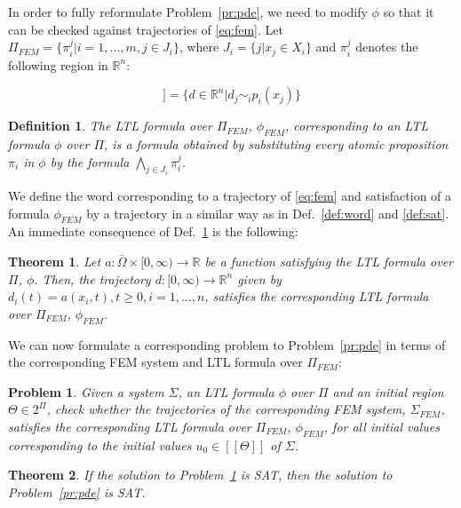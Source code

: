 \documentclass{article}
\newtheorem{theorem}{Theorem}
\newtheorem{definition}{Definition}
\newtheorem{problem}{Problem}
\newcommand*{\R}{\mathbb{R}}
\newcommand*{\psat}[1]{[[#1]]}
\begin{document}
\iffalse

In order to fully reformulate Problem~\ref{pr:pde}, we need to modify $\phi$ so
that it can be checked against trajectories of \eqref{eq:fem}. Let $\Pi_{FEM} =
\{\pi_i^j | i =1,...,m, j \in J_i\}$, where $J_i = \{j | x_j \in X_i\}$ and
$\pi_i^j$ denotes the following region in $\R^n$:

\begin{equation}
    \psat{\pi_i^j} = \{d \in \R^n | d_j \sim_i p_i(x_j)\}
\end{equation}

\begin{definition}\label{def:femformula}
    The LTL formula over $\Pi_{FEM}$, $\phi_{FEM}$, corresponding to an LTL formula
    $\phi$ over $\Pi$, is a formula obtained by substituting every atomic
    proposition $\pi_i$ in $\phi$ by the formula $\bigwedge_{j \in J_i}
    \pi_i^j$.
\end{definition}

We define the word corresponding to a trajectory of \eqref{eq:fem} and
satisfaction of a formula $\phi_{FEM}$ by a trajectory in a similar way as in
Def.~\ref{def:word} and \ref{def:sat}. An immediate consequence of
Def.~\ref{def:femformula} is the following:

\begin{theorem}\label{th:equiv}
    Let $a : \bar\Omega \times [0, \infty) \rightarrow \R$ be a function
    satisfying the LTL formula over $\Pi$, $\phi$. Then, the trajectory $d : [0,
    \infty) \rightarrow \R^n$ given by $d_i(t) = a(x_i, t), t \geq 0, i =
    1,...,n$, satisfies the corresponding LTL formula over $\Pi_{FEM}$, $\phi_{FEM}$.
\end{theorem}

We can now formulate a corresponding problem to Problem~\ref{pr:pde} in terms of 
the corresponding FEM system and LTL formula over $\Pi_{FEM}$:

\begin{problem}\label{pr:fem}
    Given a system $\Sigma$, an LTL formula $\phi$ over $\Pi$ and an initial
    region $\Theta \in 2^\Pi$, check whether the trajectories of the corresponding
    FEM system, $\Sigma_{FEM}$, satisfies the corresponding LTL formula over
    $\Pi_{FEM}$, $\phi_{FEM}$, for all initial values corresponding to the
    initial values $u_0 \in \psat{\Theta}$ of $\Sigma$.
\end{problem}

\begin{theorem}
    If the solution to Problem~\ref{pr:fem} is SAT, then the solution to
    Problem~\ref{pr:pde} is SAT.
\end{theorem}
\end{document}
